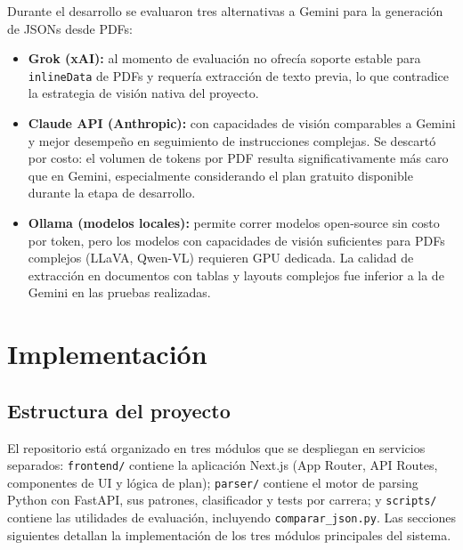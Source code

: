 \documentclass[12pt, a4paper]{report}
\begin{document}
Durante el desarrollo se evaluaron tres alternativas a Gemini para la generación de JSONs
desde PDFs:

\begin{itemize}
  \item \textbf{Grok (xAI):} al momento de evaluación no ofrecía soporte estable para
        \texttt{inlineData} de PDFs y requería extracción de texto previa, lo que contradice
        la estrategia de visión nativa del proyecto.

  \item \textbf{Claude API (Anthropic):} con capacidades de visión comparables a Gemini y
        mejor desempeño en seguimiento de instrucciones complejas. Se descartó por costo:
        el volumen de tokens por PDF resulta significativamente más caro que en Gemini,
        especialmente considerando el plan gratuito disponible durante la etapa de
        desarrollo.

  \item \textbf{Ollama (modelos locales):} permite correr modelos open-source sin costo por
        token, pero los modelos con capacidades de visión suficientes para PDFs complejos
        (LLaVA, Qwen-VL) requieren GPU dedicada. La calidad de extracción en documentos con
        tablas y layouts complejos fue inferior a la de Gemini en las pruebas realizadas.
\end{itemize}

\chapter{Implementación}
\label{cap:implementacion}

\section{Estructura del proyecto}

El repositorio está organizado en tres módulos que se despliegan en servicios separados:
\texttt{frontend/} contiene la aplicación Next.js (App Router, API Routes, componentes de
UI y lógica de plan); \texttt{parser/} contiene el motor de parsing Python con FastAPI,
sus patrones, clasificador y tests por carrera; y \texttt{scripts/} contiene las
utilidades de evaluación, incluyendo \texttt{comparar\_json.py}. Las secciones siguientes
detallan la implementación de los tres módulos principales del sistema.
\end{document}
